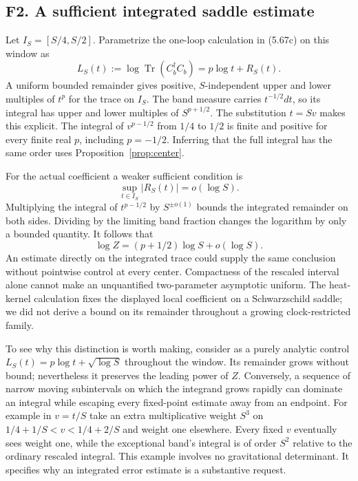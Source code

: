 \documentclass[11pt]{article}
\newcommand{\Tr}{\operatorname{Tr}}
\begin{document}
\subsection{F2. A sufficient integrated saddle estimate}
Let $I_S=[S/4,S/2]$. Parametrize the one-loop calculation in (5.67c) on this window as
\[
 L_S(t):=\log\Tr(C_b^\dagger C_b)=p\log t+R_S(t).
\]
A uniform bounded remainder gives positive, $S$-independent upper and lower multiples of $t^p$ for the trace on $I_S$. The band measure carries $t^{-1/2}dt$, so its integral has upper and lower multiples of $S^{p+1/2}$. The substitution $t=Sv$ makes this explicit. The integral of $v^{p-1/2}$ from $1/4$ to $1/2$ is finite and positive for every finite real $p$, including $p=-1/2$. Inferring that the full integral has the same order uses Proposition~\ref{prop:center}.

For the actual coefficient a weaker sufficient condition is
\begin{equation}\label{eq:rem}
 \sup_{t\in I_S}|R_S(t)|=o(\log S).
\end{equation}
Multiplying the integral of $t^{p-1/2}$ by $S^{\pm o(1)}$ bounds the integrated remainder on both sides. Dividing by the limiting band fraction changes the logarithm by only a bounded quantity. It follows that
\[
 \log Z=(p+1/2)\log S+o(\log S).
\]
An estimate directly on the integrated trace could supply the same conclusion without pointwise control at every center. Compactness of the rescaled interval alone cannot make an unquantified two-parameter asymptotic uniform. The heat-kernel calculation fixes the displayed local coefficient on a Schwarzschild saddle; we did not derive a bound on its remainder throughout a growing clock-restricted family.

To see why this distinction is worth making, consider as a purely analytic control $L_S(t)=p\log t+\sqrt{\log S}$ throughout the window. Its remainder grows without bound; nevertheless it preserves the leading power of $Z$. Conversely, a sequence of narrow moving subintervals on which the integrand grows rapidly can dominate an integral while escaping every fixed-point estimate away from an endpoint. For example in $v=t/S$ take an extra multiplicative weight $S^3$ on $1/4+1/S<v<1/4+2/S$ and weight one elsewhere. Every fixed $v$ eventually sees weight one, while the exceptional band's integral is of order $S^2$ relative to the ordinary rescaled integral. This example involves no gravitational determinant. It specifies why an integrated error estimate is a substantive request.
\end{document}
